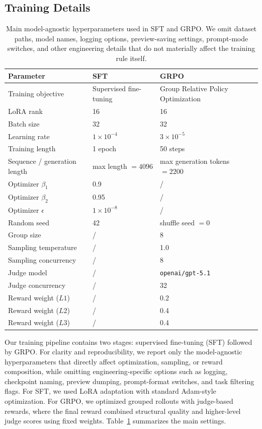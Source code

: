 \documentclass{llmxive}
\begin{document}
\subsection{Training Details}
\begin{table}[t]
  \centering
  \small
  \setlength{\tabcolsep}{8pt}
  \begin{tabular}{lll}
  \toprule
  \textbf{Parameter} & \textbf{SFT} & \textbf{GRPO} \\
  \midrule
  Training objective & Supervised fine-tuning & Group Relative Policy Optimization \\
  LoRA rank & 16 & 16 \\
  Batch size & 32 & 32 \\
  Learning rate & $1\times10^{-4}$ & $3\times10^{-5}$ \\
  Training length & 1 epoch & 50 steps \\
  Sequence / generation length & max length $=4096$ & max generation tokens $=2200$ \\
  Optimizer $\beta_1$ & 0.9 & / \\
  Optimizer $\beta_2$ & 0.95 & / \\
  Optimizer $\epsilon$ & $1\times10^{-8}$ & / \\
  Random seed & 42 & shuffle seed $=0$ \\
  Group size & / & 8 \\
  Sampling temperature & / & 1.0 \\
  Sampling concurrency & / & 8 \\
  Judge model & / & \texttt{openai/gpt-5.1} \\
  Judge concurrency & / & 32 \\
  Reward weight ($L1$) & / & 0.2 \\
  Reward weight ($L2$) & / & 0.4 \\
  Reward weight ($L3$) & / & 0.4 \\
  \bottomrule
  \end{tabular}
  \caption{Main model-agnostic hyperparameters used in SFT and GRPO. We omit dataset paths, model names, logging options, preview-saving settings,
  prompt-mode switches, and other engineering details that do not materially affect the training rule itself.}
  \label{tab:appendix_training_hparams}
  \end{table}

Our training pipeline contains two stages: supervised fine-tuning (SFT) followed by GRPO.
  For clarity and reproducibility, we report only the model-agnostic hyperparameters that directly affect optimization, sampling, or reward
  composition, while omitting engineering-specific options such as logging, checkpoint naming, preview dumping, prompt-format switches, and task
  filtering flags.
  For SFT, we used LoRA adaptation with standard Adam-style optimization.
  For GRPO, we optimized grouped rollouts with judge-based rewards, where the final reward combined structural quality and higher-level judge scores
  using fixed weights.
  Table~\ref{tab:appendix_training_hparams} summarizes the main settings.
\end{document}
